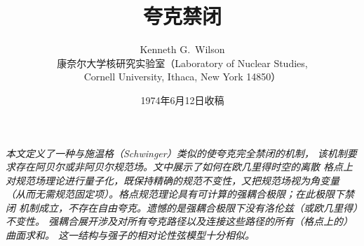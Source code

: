 \documentclass[11pt]{ctexart}
\title{\textbf{夸克禁闭}}
\author{Kenneth G.~Wilson\\[2mm]
        \normalsize 康奈尔大学核研究实验室（Laboratory of Nuclear Studies,\\
        \normalsize Cornell University, Ithaca, New York 14850）}
\date{1974年6月12日收稿}
\begin{document}
\maketitle

\begin{center}
\begin{minipage}{0.86\textwidth}
\textit{本文定义了一种与施温格（Schwinger）类似的使夸克完全禁闭的机制，
该机制要求存在阿贝尔或非阿贝尔规范场。文中展示了如何在欧几里得时空的离散
格点上对规范场理论进行量子化，既保持精确的规范不变性，又把规范场视为角变量
（从而无需规范固定项）。格点规范理论具有可计算的强耦合极限；在此极限下禁闭
机制成立，不存在自由夸克。遗憾的是强耦合极限下没有洛伦兹（或欧几里得）不变性。
强耦合展开涉及对所有夸克路径以及连接这些路径的所有（格点上的）曲面求和。
这一结构与强子的相对论性弦模型十分相似。}
\end{minipage}
\end{center}








\end{document}
